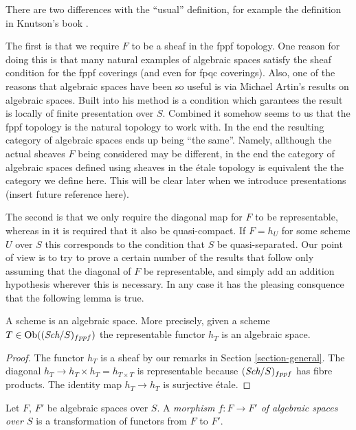 \noindent
There are two differences with the ``usual'' definition, for example the
definition in Knutson's book \cite{Kn}.

\medskip\noindent
The first is that we require $F$ to be a sheaf in the fppf topology.
One reason for doing this is that many natural examples
of algebraic spaces satisfy the sheaf condition for the fppf coverings
(and even for fpqc coverings). Also, one of the reasons that algebraic
spaces have been so useful is via Michael Artin's results on algebraic spaces.
Built into his method is a condition which garantees the result is
locally of finite presentation over $S$.
Combined it somehow seems to us that the fppf topology
is the natural topology to work with. In the end the resulting category
of algebraic spaces ends up being ``the same''. Namely, allthough the actual
sheaves $F$ being considered may be different, in the end the
category of algebraic spaces defined using sheaves in the \'etale topology
is equivalent the the category we define here. This will be clear later
when we introduce presentations (insert future reference here).

\medskip\noindent
The second is that we only require the diagonal map for $F$ to be
representable, whereas in \cite{Kn} it is required that it also
be quasi-compact. If $F = h_U$ for some scheme $U$ over $S$
this corresponds to the condition that $S$ be quasi-separated.
Our point of view is to try to prove a certain
number of the results that follow only assuming that the diagonal
of $F$ be representable, and simply add an addition hypothesis wherever
this is necessary. In any case it has the pleasing consquence that
the following lemma is true.

\begin{lemma}
\label{lemma-scheme-is-space}
A scheme is an algebraic space. More precisely,
given a scheme $T \in \mathop{\rm Ob}\nolimits((\textit{Sch}/S)_{fppf})$
the representable functor $h_T$ is an algebraic space.
\end{lemma}

\begin{proof}
The functor $h_T$ is a sheaf by our remarks in Section \ref{section-general}.
The diagonal $h_T \to h_T \times h_T = h_{T \times T}$ is
representable because $(\textit{Sch}/S)_{fppf}$ has fibre products.
The identity map $h_T \to h_T$ is surjective \'etale.
\end{proof}

\begin{definition}
\label{definition-morphism-algebraic-spaces}
Let $F$, $F'$ be algebraic spaces over $S$.
A {\it morphism $f : F \to F'$ of algebraic spaces over $S$}
is a transformation of functors from $F$ to $F'$.
\end{definition}


